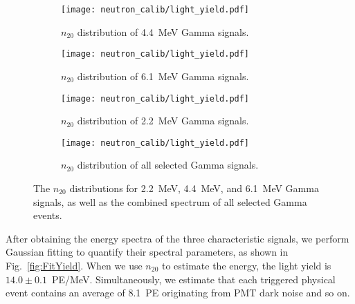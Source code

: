 \begin{figure}[htbp]
	\centering
	\begin{subfigure}[b]{0.48\textwidth}
		\centering
		\texttt{[image: neutron\_calib/light\_yield.pdf]}
		\caption{$n_{20}$ distribution of \SI{4.4}{MeV} Gamma signals.}
		\label{fig:promptene4}
	\end{subfigure}
	\hfill
	\begin{subfigure}[b]{0.48\textwidth}
		\centering
		\texttt{[image: neutron\_calib/light\_yield.pdf]}
		\caption{$n_{20}$ distribution of \SI{6.1}{MeV} Gamma signals.}
		\label{fig:promptene6}
	\end{subfigure}

	\begin{subfigure}[b]{0.48\textwidth}
		\centering
		\texttt{[image: neutron\_calib/light\_yield.pdf]}
		\caption{$n_{20}$ distribution of \SI{2.2}{MeV} Gamma signals.}
		\label{fig:promptene2}
	\end{subfigure}
	\hfill
	\begin{subfigure}[b]{0.48\textwidth}
		\centering
		\texttt{[image: neutron\_calib/light\_yield.pdf]}
		\caption{$n_{20}$ distribution of all selected Gamma signals.}
		\label{fig:prompteneall}
	\end{subfigure}
	\caption{
		The $n_{20}$ distributions for \SI{2.2}{MeV}, \SI{4.4}{MeV}, and \SI{6.1}{MeV} Gamma signals, as well as the combined spectrum of all selected Gamma events.
	}
	\label{fig:energySpectrum46}
\end{figure}
After obtaining the energy spectra of the three characteristic signals, we perform Gaussian fitting to quantify their spectral parameters, as shown in Fig.~\ref{fig:FitYield}. When we use $n_{20}$ to estimate the energy, the light yield is $14.0\pm 0.1$~PE/MeV. Simultaneously, we estimate that each triggered physical event contains an average of \SI{8.1}{PE} originating from PMT dark noise and so on.
